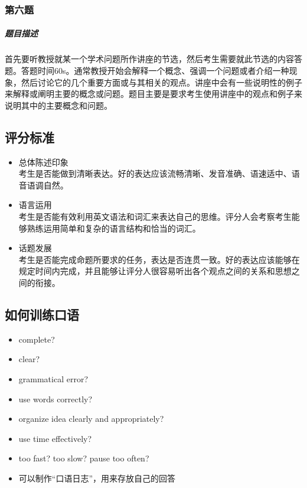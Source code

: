 \documentclass[UTF8]{ctexart}
\begin{document}
\subsubsection{第六题}
\subparagraph{题目描述}首先要听教授就某一个学术问题所作讲座的节选，然后考生需要就此节选的内容答题。答题时间60s。通常教授开始会解释一个概念、强调一个问题或者介绍一种现象，然后讨论它的几个重要方面或与其相关的观点。讲座中会有一些说明性的例子来解释或阐明主要的概念或问题。题目主要是要求考生使用讲座中的观点和例子来说明其中的主要概念和问题。
\subsection{评分标准}
\begin{itemize}
  \item 总体陈述印象\\
  考生是否能做到清晰表达。好的表达应该流畅清晰、发音准确、语速适中、语音语调自然。
  \item 语言运用\\
  考生是否能有效利用英文语法和词汇来表达自己的思维。评分人会考察考生能够熟练运用简单和复杂的语言结构和恰当的词汇。
  \item 话题发展\\
  考生是否能完成命题所要求的任务，表达是否连贯一致。好的表达应该能够在规定时间内完成，并且能够让评分人很容易听出各个观点之间的关系和思想之间的衔接。
\end{itemize}
\subsection{如何训练口语}
\begin{itemize}
  \item complete?
  \item clear?
  \item grammatical error?
  \item use words correctly?
  \item organize idea clearly and appropriately?
  \item use time effectively?
  \item too fast? too slow? pause too often?
  \item 可以制作“口语日志”，用来存放自己的回答
\end{itemize}
\end{document}
